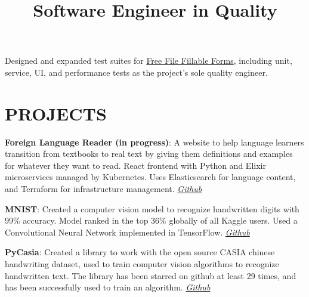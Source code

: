 \documentclass[margin]{res}
\begin{document}
\begin{resume}
\title{\textbf{Software Engineer in Quality}}
\begin{position}
Designed and expanded test suites for \href{https://www.FreeFileFillableForms.com}{Free File Fillable Forms}, including unit, service, UI, and performance tests as the project's sole quality engineer.
\end{position}

\section{PROJECTS}

\par
\textbf{Foreign Language Reader (in progress)}:
A website to help language learners transition from textbooks to real text by giving them definitions and examples for whatever they want to read. React frontend with Python and Elixir microservices managed by Kubernetes. Uses Elasticsearch for language content, and Terraform for infrastructure management. \textit{\href{https://github.com/lucaskjaero/foreign-language-reader}{Github}}

\par
\textbf{MNIST}:
Created a computer vision model to recognize handwritten digits with 99\% accuracy. Model ranked in the top 36\% globally of all Kaggle users. Used a Convolutional Neural Network implemented in TensorFlow. \textit{\href{https://github.com/lucaskjaero/MNIST}{Github}}

\par
\textbf{PyCasia}:
Created a library to work with the open source CASIA chinese handwriting dataset, used to train computer vision algorithms to recognize handwritten text. The library has been starred on github at least 29 times, and has been successfully used to train an algorithm. \textit{\href{https://github.com/lucaskjaero/PyCasia}{Github}}



\end{resume}
\end{document}
